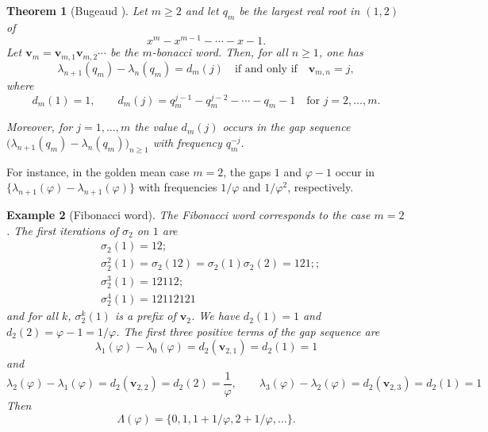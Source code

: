 \documentclass{amsart}
\newtheorem{theorem}{Theorem}[section]
\newtheorem{example}[theorem]{Example}
\begin{document}
\begin{theorem}[Bugeaud \cite{bug02}]\label{thm2}
Let $m \geq 2$ and let $q_m$ be the largest real root in $(1,2)$ of
\[
x^m - x^{m-1} - \cdots - x - 1.
\]
Let $\mathbf v_m = \mathbf v_{m,1}\mathbf v_{m,2}\cdots$ be the
$m$-bonacci word. 
Then, for all $n \geq 1$, one has
\[
\lambda_{n+1}(q_m)-\lambda_n(q_m)=d_m(j)
\quad \text{if and only if} \quad
\mathbf v_{m,n}=j,
\]
where
\[
d_m(1)=1,
\qquad
d_m(j)=q_m^{j-1}-q_m^{j-2}-\cdots - q_m - 1
\quad \text{for } j=2,\dots,m.
\]

Moreover, for $j=1,\dots,m$ the value $d_m(j)$ occurs in the gap sequence
$\bigl(\lambda_{n+1}(q_m)-\lambda_n(q_m)\bigr)_{n\geq 1}$
with frequency
$q_m^{-j}.$
\end{theorem}
For instance, in the golden mean case $m=2$, the gaps $1$ and $\varphi-1$ occur in $\{\lambda_{n+1}(\varphi)-\lambda_{n+1}(\varphi)\}$ with frequencies $1/\varphi$ and $1/\varphi^2$, respectively. 

\begin{example}[Fibonacci word]
The Fibonacci word corresponds to the case $m=2$. The first iterations of $\sigma_2$ on $1$ are
\begin{align*}
&\sigma_2(1)=12;\\
&\sigma_2^2(1)=\sigma_2(12)=\sigma_2(1)\sigma_2(2)=121;;\\
&\sigma_2^3(1)=12112;\\
&\sigma_2^4(1)=12112121\end{align*}
and for all $k$, $\sigma_2^k(1)$ is a prefix of $\mathbf v_2$. 
We have $d_2(1)=1$ and $d_2(2)=\varphi-1=1/\varphi$. 
The first three positive terms  of the gap sequence are 
$$\lambda_1(\varphi)-\lambda_0(\varphi)=d_2(\mathbf v_{2,1})=d_2(1)=1$$
and
$$\lambda_2(\varphi)-\lambda_1(\varphi)=d_2(\mathbf v_{2,2})=d_2(2)=\frac{1}{\varphi},\qquad \lambda_3(\varphi)-\lambda_2(\varphi)=d_2(\mathbf v_{2,3})=d_2(1)=1$$ Then 
$$\Lambda(\varphi)=\{0,1,1+1/\varphi,2+1/\varphi,\dots\}.$$



\end{example}
\end{document}
